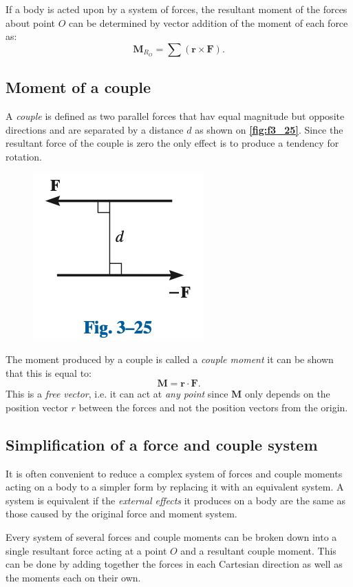 If a body is acted upon by a system of forces, the resultant moment of the forces about point $O$ can be determined by vector addition of the moment of each force as:
\[ 
\textbf{M}_{R_O} = \sum \left( \textbf{r} \times \textbf{F} \right)
.\]


\subsection{Moment of a couple}
A \textit{couple} is defined as two parallel forces that hav equal magnitude but opposite directions and are separated by a distance $d$ as shown on \textbf{\autoref{fig:f3_25}}. Since the resultant force of the couple is zero the only effect is to produce a tendency for rotation.

\begin{figure} [ht]
  \centering
  \includegraphics[width=0.25\linewidth]{./figures/f3_25.png}
  \caption{}
  \label{fig:f3_25}
\end{figure}

The moment produced by a couple is called a \textit{couple moment} it can be shown that this is equal to:
\[ 
\textbf{M} = \textbf{r} \cdot \textbf{F}
.\]
This is a \textit{free vector}, i.e. it can act at \textit{any point} since $\textbf{M}$ only depends on the position vector $r$ between the forces and not the position vectors from the origin.


\subsection{Simplification of a force and couple system}
It is often convenient to reduce a complex system of forces and couple moments acting on a body to a simpler form by replacing it with an equivalent system. A system is equivalent if the \textit{external effects} it produces on a body are the same as those caused by the original force and moment system. 

Every system of several forces and couple moments can be broken down into a single resultant force acting at a point $O$ and a resultant couple moment. This can be done by adding together the forces in each Cartesian direction as well as the moments each on their own. 

